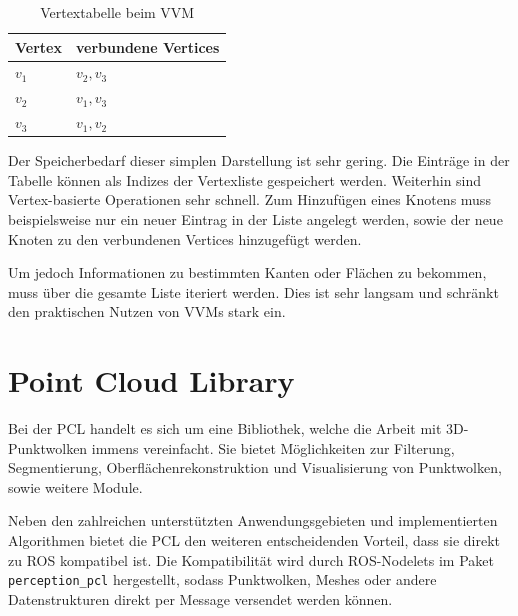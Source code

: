 \begin{table}[ht]
\centering
\begin{tabular}{| l | l |}
	\hline
	Vertex & verbundene Vertices\\
	\hline
	$v_1$ & $v_2, v_3$\\
	$v_2$ & $v_1, v_3$\\
	$v_3$ & $v_1, v_2$\\
	\hline
\end{tabular}
\caption{Vertextabelle beim \ac{VVM}}
\label{tab:vvm-vertex-table}
\end{table}

Der Speicherbedarf dieser simplen Darstellung ist sehr gering.
Die Einträge in der Tabelle können als Indizes der Vertexliste gespeichert werden.
Weiterhin sind Vertex-basierte Operationen sehr schnell.
Zum Hinzufügen eines Knotens muss beispielsweise nur ein neuer Eintrag in der Liste angelegt werden, sowie der neue Knoten zu den verbundenen Vertices hinzugefügt werden.

Um jedoch Informationen zu bestimmten Kanten oder Flächen zu bekommen, muss über die gesamte Liste iteriert werden.
Dies ist sehr langsam und schränkt den praktischen Nutzen von \acp{VVM} stark ein.




\section{Point Cloud Library}
\label{sec:pcl}

Bei der \ac{PCL} \cite{rusu2011pcl} handelt es sich um eine Bibliothek, welche die Arbeit mit 3D-Punktwolken immens vereinfacht.
Sie bietet Möglichkeiten zur Filterung, Segmentierung, Oberflächenrekonstruktion und Visualisierung von Punktwolken, sowie weitere Module.

Neben den zahlreichen unterstützten Anwendungsgebieten und implementierten Algorithmen bietet die \ac{PCL} den weiteren entscheidenden Vorteil, dass sie direkt zu \ac{ROS} kompatibel ist.
Die Kompatibilität wird durch ROS-Nodelets im Paket \texttt{perception\_pcl} hergestellt, sodass Punktwolken, Meshes oder andere Datenstrukturen direkt per Message versendet werden können.
